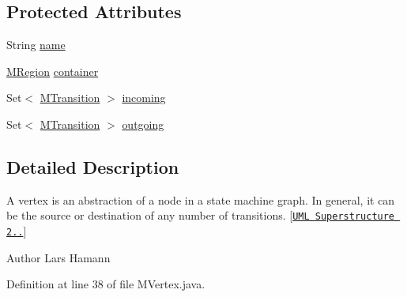 \subsection*{Protected Attributes}
\begin{DoxyCompactItemize}
\item 
String \hyperlink{classorg_1_1tzi_1_1use_1_1uml_1_1mm_1_1statemachines_1_1_m_vertex_a9bb884a76140732039ff1fbf631b6575}{name}
\item 
\hyperlink{classorg_1_1tzi_1_1use_1_1uml_1_1mm_1_1statemachines_1_1_m_region}{M\-Region} \hyperlink{classorg_1_1tzi_1_1use_1_1uml_1_1mm_1_1statemachines_1_1_m_vertex_a6fac4b2809015693c6c39f1f874970aa}{container}
\item 
Set$<$ \hyperlink{classorg_1_1tzi_1_1use_1_1uml_1_1mm_1_1statemachines_1_1_m_transition}{M\-Transition} $>$ \hyperlink{classorg_1_1tzi_1_1use_1_1uml_1_1mm_1_1statemachines_1_1_m_vertex_a487f5cd45570211cdd98ab752c9c5a28}{incoming}
\item 
Set$<$ \hyperlink{classorg_1_1tzi_1_1use_1_1uml_1_1mm_1_1statemachines_1_1_m_transition}{M\-Transition} $>$ \hyperlink{classorg_1_1tzi_1_1use_1_1uml_1_1mm_1_1statemachines_1_1_m_vertex_a7646c20fade1913bed03c4b056e92b08}{outgoing}
\end{DoxyCompactItemize}


\subsection{Detailed Description}
A vertex is an abstraction of a node in a state machine graph. In general, it can be the source or destination of any number of transitions. \mbox{[}\href{http://www.omg.org/spec/UML/}{\tt U\-M\-L Superstructure 2..}\mbox{]}

\begin{DoxyAuthor}{Author}
Lars Hamann 
\end{DoxyAuthor}


Definition at line 38 of file M\-Vertex.\-java.



